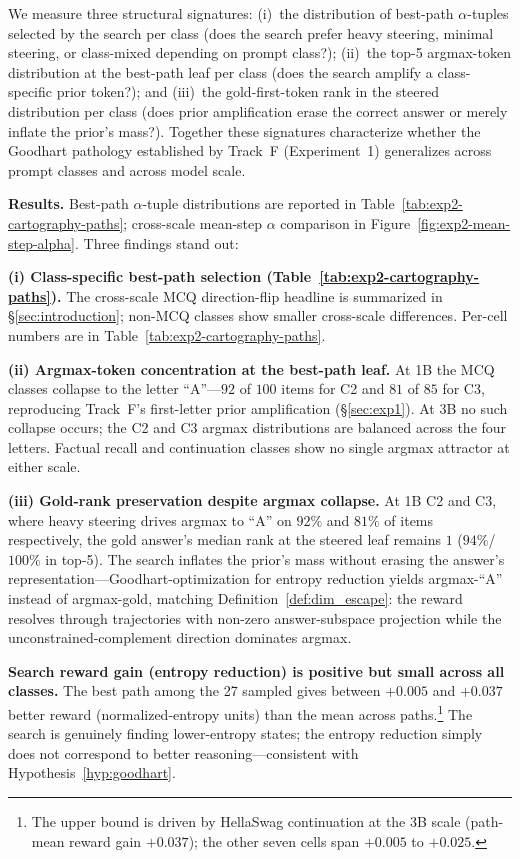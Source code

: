 We measure three structural signatures: (i)~the distribution of best-path $\alpha$-tuples selected by the search per class (does the search prefer heavy steering, minimal steering, or class-mixed depending on prompt class?); (ii)~the top-5 argmax-token distribution at the best-path leaf per class (does the search amplify a class-specific prior token?); and (iii)~the gold-first-token rank in the steered distribution per class (does prior amplification erase the correct answer or merely inflate the prior's mass?). Together these signatures characterize whether the Goodhart pathology established by Track~F (Experiment~1) generalizes across prompt classes and across model scale.

\textbf{Results.} Best-path $\alpha$-tuple distributions are reported in Table~\ref{tab:exp2-cartography-paths}; cross-scale mean-step $\alpha$ comparison in Figure~\ref{fig:exp2-mean-step-alpha}. Three findings stand out:

\textbf{(i) Class-specific best-path selection (Table~\ref{tab:exp2-cartography-paths}).} The cross-scale MCQ direction-flip headline is summarized in §\ref{sec:introduction}; non-MCQ classes show smaller cross-scale differences. Per-cell numbers are in Table~\ref{tab:exp2-cartography-paths}.

\textbf{(ii) Argmax-token concentration at the best-path leaf.} At 1B the MCQ classes collapse to the letter ``A''---$92$ of $100$ items for C2 and $81$ of $85$ for C3, reproducing Track~F's first-letter prior amplification (§\ref{sec:exp1}). At 3B no such collapse occurs; the C2 and C3 argmax distributions are balanced across the four letters. Factual recall and continuation classes show no single argmax attractor at either scale.

\textbf{(iii) Gold-rank preservation despite argmax collapse.} At 1B C2 and C3, where heavy steering drives argmax to ``A'' on $92\%$ and $81\%$ of items respectively, the gold answer's median rank at the steered leaf remains $1$ ($94\%$/$100\%$ in top-5). The search inflates the prior's mass without erasing the answer's representation---Goodhart-optimization for entropy reduction yields argmax-``A'' instead of argmax-gold, matching Definition~\ref{def:dim_escape}: the reward resolves through trajectories with non-zero answer-subspace projection while the unconstrained-complement direction dominates argmax.

\textbf{Search reward gain (entropy reduction) is positive but small across all classes.} The best path among the 27 sampled gives between $+0.005$ and $+0.037$ better reward (normalized-entropy units) than the mean across paths.\footnote{The upper bound is driven by HellaSwag continuation at the 3B scale (path-mean reward gain $+0.037$); the other seven cells span $+0.005$ to $+0.025$.} The search is genuinely finding lower-entropy states; the entropy reduction simply does not correspond to better reasoning---consistent with Hypothesis~\ref{hyp:goodhart}.


